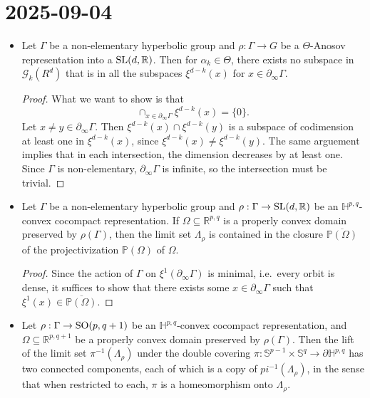 \documentclass{report}
\begin{document}
\section{2025-09-04}
\begin{itemize}
    \item Let $\Gamma$ be a non-elementary hyperbolic group and $\rho: \Gamma \to G$ be a $\Theta$-Anosov representation into a $\operatorname{{\mathrm{SL}}}(d,\mathbb R)$.
    Then for $\alpha_k \in \Theta$, there exists no subspace in $\mathcal G_k(R^d)$ that is in all the subspaces $\xi^{d-k}(x)$ for $x \in \partial_\infty \Gamma$.
    \begin{proof}
        What we want to show is that
        \[
        \cap_{x \in \partial_\infty \Gamma} \xi^{d-k}(x) = \{0\}.
        \]
        Let $x \neq y \in \partial_\infty \Gamma$.
        Then $\xi^{d-k}(x) \cap \xi^{d-k}(y)$ is a subspace of codimension at least one in $\xi^{d-k}(x)$, since $\xi^{d-k}(x) \neq \xi^{d-k}(y)$.
        The same arguement implies that in each intersection, the dimension decreases by at least one.
        Since $\Gamma$ is non-elementary, $\partial_\infty \Gamma$ is infinite, so the intersection must be trivial.
    \end{proof}
    \item Let $\Gamma$ be a non-elementary hyperbolic group and $\rho: \Gamma \to \operatorname{{\mathrm{SL}}}(d,\mathbb R)$ be an $\mathbb H^{p,q}$-convex cocompact representation.
    If $\Omega \subseteq \mathbb R^{p,q}$ is a properly convex domain preserved by $\rho(\Gamma)$, then the limit set $\Lambda_\rho$ is contained in the closure $\overline{\mathbb P(\Omega)}$ of the projectivization $\mathbb P(\Omega)$ of $\Omega$.
    \begin{proof}
        Since the action of $\Gamma$ on $\xi^1(\partial_\infty \Gamma)$ is minimal, i.e.\ every orbit is dense, it suffices to show that there exists some $x \in \partial_\infty \Gamma$ such that $\xi^1(x) \in \overline{\mathbb P(\Omega)}$.
    \end{proof}
    \item Let $\rho: \Gamma \to \operatorname{{\mathrm{SO}}}(p, q+1)$ be an $\mathbb H^{p,q}$-convex cocompact representation, and $\Omega \subseteq \mathbb R^{p,q+1}$ be a properly convex domain preserved by $\rho(\Gamma)$.
    Then the lift of the limit set $\pi^{-1}(\Lambda_\rho)$ under the double covering $\pi: \mathbb S^{p-1} \times \mathbb S^q \to \partial \mathbb H^{p,q}$ has two connected components, each of which is a copy of $pi^{-1}(\Lambda_\rho)$, in the sense that when restricted to each, $\pi$ is a homeomorphism onto $\Lambda_\rho$.

\end{itemize}
\end{document}
